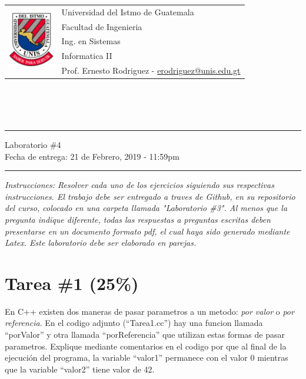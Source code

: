 \documentclass{article}
\newcommand{\horrule}[1]{\rule{\linewidth}{#1}}
\begin{document}
\begin{tabular}{l l}
\multirow{5}{*}{\includegraphics[width=2cm]{../../recursos/logo.png}} & Universidad del Istmo de Guatemala \\
 & Facultad de Ingenieria \\
 & Ing. en Sistemas \\
 & Informatica II \\
 & Prof. Ernesto Rodriguez - \href{mailto:erodriguez@unis.edu.gt}{erodriguez@unis.edu.gt} \\
\end{tabular}
\\\\\\

\begin{center}
        \horrule{0.5pt}
        \huge{Laboratorio \#4} \\
        \large{Fecha de entrega: 21 de Febrero, 2019 - 11:59pm} \\
        \horrule{1pt}
\end{center}

\emph{Instrucciones: Resolver cada uno de los ejercicios siguiendo sus respectivas
instrucciones. El trabajo debe ser entregado a traves de Github, en su repositorio del curso, colocado en una carpeta llamada "Laboratorio \#3".
Al menos que la pregunta indique diferente, todas las respuestas a preguntas escritas deben presentarse en
un documento formato pdf, el cual haya sido generado mediante Latex. Este laboratorio
debe ser elaborado en parejas.}

\section*{Tarea \#1 (25\%)}

En C++ existen dos maneras de pasar parametros a un metodo: \emph{por valor}
o \emph{por referencia}. En el codigo adjunto (``Tarea1.cc'') hay una funcion
llamada ``porValor'' y otra llamada ``porReferencia'' que utilizan estas formas
de pasar parametros. Explique mediante comentarios en el codigo por que al
final de la ejecuci\'on del programa, la variable ``valor1'' permanece
con el valor 0 mientras que la variable ``valor2'' tiene valor de 42.
\end{document}
